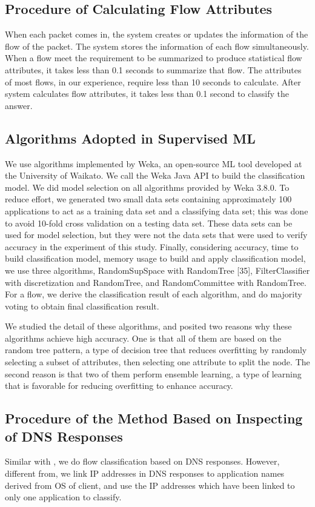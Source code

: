 \documentclass[10pt,journal]{IEEEtran}
\begin{document}
\subsection{Procedure of Calculating Flow Attributes}
When each packet comes in, the system creates or updates the information of the flow of the packet. The system stores the information of each flow simultaneously. When a flow meet the requirement to be summarized to produce statistical flow attributes, it takes less than 0.1 seconds to summarize that flow. The attributes of most flows, in our experience, require less than 10 seconds to calculate. After system calculates flow attributes, it takes less than 0.1 second to classify the answer.



\subsection{Algorithms Adopted in Supervised ML}
We use algorithms implemented by Weka, an open-source ML tool developed at the University of Waikato. We call the Weka Java API to build the classification model. We did model selection on all algorithms provided by Weka 3.8.0. To reduce effort, we generated two small data sets containing approximately 100 applications to act as a training data set and a classifying data set; this was done to avoid 10-fold cross validation on a testing data set. These data sets can be used for model selection, but they were not the data sets that were used to verify accuracy in the experiment of this study. Finally, considering accuracy, time to build classification model, memory usage to build and apply classification model, we use three algorithms, RandomSupSpace with RandomTree [35], FilterClassifier with discretization and RandomTree, and RandomCommittee with RandomTree. For a flow, we derive the classification result of each algorithm, and do majority voting to obtain final classification result.

We studied the detail of these algorithms, and posited two reasons why these algorithms achieve high accuracy. One is that all of them are based on the random tree pattern, a type of decision tree that reduces overfitting by randomly selecting a subset of attributes, then selecting one attribute to split the node. The second reason is that two of them perform ensemble learning, a type of learning that is favorable for reducing overfitting to enhance accuracy.



\subsection{Procedure of the Method Based on Inspecting of DNS Responses}
Similar with \cite{Plonka_flexibletraffic}, we do flow classification based on DNS responses. However, different from\cite{Plonka_flexibletraffic}, we link IP addresses in DNS responses to application names derived from OS of client, and use the IP addresses which have been linked to only one application to classify.
\end{document}

